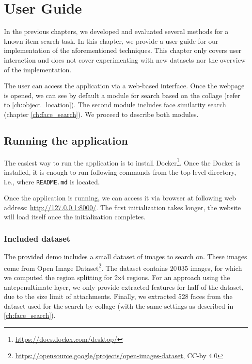 \chapter{User Guide}
\label{ch:user_guide}

In the previous chapters, we developed and evaluated several methods for a known-item-search task. In this chapter, we provide a user guide for our implementation of the aforementioned techniques. This chapter only covers user interaction and does not cover experimenting with new datasets nor the overview of the implementation.

The user can access the application via a web-based interface. Once the webpage is opened, we can see by default a module for search based on the collage (refer to \ref{ch:object_location}). The second module includes face similarity search (chapter \ref{ch:face_search}). We proceed to describe both modules.

\section{Running the application}

The easiest way to run the application is to install Docker\footnote{\url{https://docs.docker.com/desktop/}}. Once the Docker is installed, it is enough to run following commands from the top-level directory, i.e., where \verb+README.md+ is located.

\vspace{0.5cm}


\vspace{0.5cm}

Once the application is running, we can access it via browser at following web address: \url{http://127.0.0.1:8000/}. The first initialization takes longer, the website will load itself once the initialization completes. 

\subsection*{Included dataset}

The provided demo includes a small dataset of images to search on. These images come from Open Image Dataset\footnote{\url{https://opensource.google/projects/open-images-dataset}, CC-by 4.0}. The dataset contains 20\,035 images, for which we computed the region splitting for 2x4 regions. For an approach using the antepenultimate layer, we only provide extracted features for half of the dataset, due to the size limit of attachments. Finally, we extracted 528 faces from the dataset used for the search by collage (with the same settings as described in \autoref{ch:face_search}).

